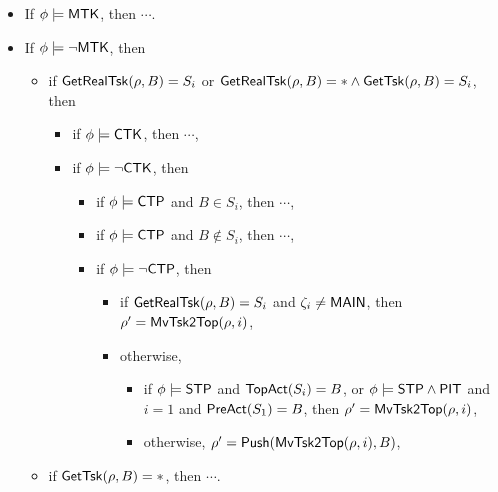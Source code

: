 \begin{itemize}
\item If $\phi \models {\sf MTK}$, then $\cdots$.
%
\item If $\phi \models \neg {\sf MTK}$, then
	\begin{itemize}
        \item if $\mathsf{GetRealTsk}(\rho, B) = S_i$ or $\mathsf{GetRealTsk}(\rho,B) = * \wedge\mathsf{GetTsk}(\rho,B) = S_i$, then
		\begin{itemize}
			\item if $\phi \models {\sf CTK}$, then $\cdots$,
			\item if $\phi \models \neg {\sf CTK}$, then
			\begin{itemize}
				\item if $\phi \models {\sf CTP}$ and $B \in S_i$, then $\cdots$,
				\item if $\phi \models {\sf CTP}$ and $B \notin S_i$, then $\cdots$,
				\item if $\phi \models \neg {\sf CTP}$, then
				\begin{itemize}
						\item if $\mathsf{GetRealTsk}(\rho, B) = S_i$ and $\zeta_i \neq {\sf MAIN}$, 
						then $\rho' = \mathsf{MvTsk2Top}(\rho, i)$,
						\item otherwise, 
						\begin{itemize}
							\item if $\phi \models {\sf STP}$ and $\mathsf{TopAct}(S_i) = B$, or $\phi \models {\sf STP} \wedge {\sf PIT}$ and $i = 1$ and $\mathsf{PreAct}(S_1) = B$, then $\rho' = \mathsf{MvTsk2Top}(\rho, i)$,
							\item otherwise, $\rho'=\mathsf{Push}(\mathsf{MvTsk2Top}(\rho, i), B)$,
						\end{itemize}
				\end{itemize}
			\end{itemize}
		\end{itemize}
	\item if $\mathsf{GetTsk}(\rho, B) = *$, then $\cdots$.
	\end{itemize}
\end{itemize}
%
